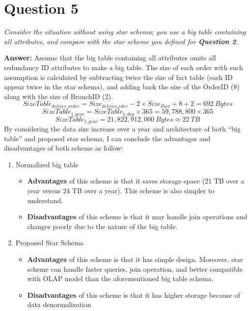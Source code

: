 \documentclass[a4paper,11pt]{article}
\begin{document}
\section*{Question 5}

\textit{Consider the situation without using star schema; you use a big table containing all attributes, and compare with the star scheme you defined for \textbf{Question 2}.} 

\noindent
\textbf{Answer:} Assume that the big table containing all attributes omits all redundancy ID attributes to make a big table. The size of each order with such assumption is calculated by subtracting twice the size of fact table (each ID appear twice in the star schema), and adding back the size of the OrderID (8) along with the size of BranchID (2).
\vspace{-0.75em}
$$SizeTable_{deliver\_order}=Size_{deliver_order}-2\times Size_{Fact}+8+2=692\ Bytes$$
$$SizeTable_{1\_year}=SizeTable_{1\_day}\times 365=59,788,800\times 365$$
$$SizeTable_{1\_year}=21,822,912,000\ Bytes\approx 22\ TB$$
\noindent
By considering the data size increase over a year and architecture of both ``big table'' and proposed star schema, I can conclude the advantages and disadvantages of both scheme as follow:
\begin{enumerate}
    \setlength{\itemsep}{0cm}
    \setlength{\parskip}{0cm}
\item Normalized big table
    \begin{itemize}
     \setlength{\itemsep}{0cm}
    \setlength{\parskip}{0cm}
\item \textbf{Advantages} of this scheme is that it saves storage space (21 TB over a year versus 24 TB over a year). This scheme is also simpler to understand.
\item \textbf{Disadvantages} of this scheme is that it may handle join operations and changes poorly due to the nature of the big table. 
     \end{itemize}  
 \item Proposed Star Schema
    \begin{itemize}
     \setlength{\itemsep}{0cm}
    \setlength{\parskip}{0cm}
\item \textbf{Advantages} of this scheme is that it has simple design. Moreover, star scheme can handle faster queries, join operation, and better compatible with OLAP model than the aforementioned big table schema. 
\item \textbf{Disadvantages} of this scheme is that it has higher storage because of data denormalization
     \end{itemize}  
    
\end{enumerate}
\end{document}
